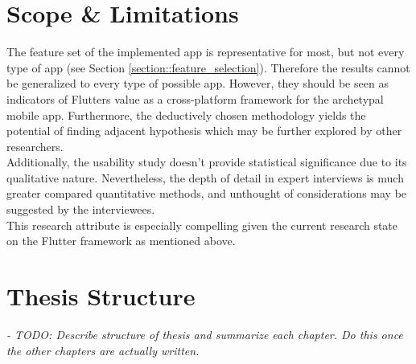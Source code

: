 \section{Scope \& Limitations}
The feature set of the implemented app is representative for most, but not every type of app (see Section \ref{section::feature_selection}). 
Therefore the results cannot be generalized to every type of possible app. 
However, they should be seen as indicators of Flutters value as a cross-platform framework for the 
archetypal mobile app. 
Furthermore, the deductively chosen methodology yields the potential of finding adjacent hypothesis which may be
further explored by other researchers.\\
Additionally, the usability study doesn't provide statistical significance due to its qualitative nature. Nevertheless, the depth of detail
in expert interviews is much greater compared quantitative methods, and unthought of considerations may be suggested by the interviewees.\\
This research attribute is especially compelling given the current research state on the Flutter framework as mentioned above. 

\section{Thesis Structure}
\textit{- TODO: Describe structure of thesis and summarize each chapter. Do this once the other chapters are actually written.}
